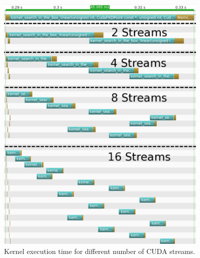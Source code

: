 \begin{center}
\begin{figure}
\includegraphics[width=0.9\textwidth]{fkdtree/nvvp_streams.png}
\caption{Kernel execution time for different number of CUDA streams.}
\label{nvvp_streams}
\end{figure}
\end{center}

